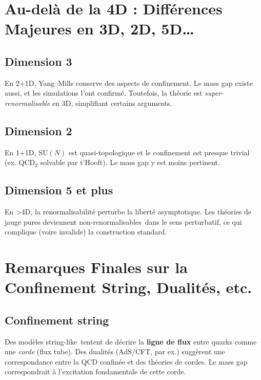 \vspace{1em}

\section{Au-delà de la 4D : Différences Majeures en 3D, 2D, 5D…}
\label{sec:11.4}

\subsection*{Dimension 3}
En 2+1D, Yang--Mills conserve des aspects de confinement. Le mass gap existe aussi, et les simulations l’ont confirmé. Toutefois, la théorie est \emph{super-renormalisable} en 3D, simplifiant certains arguments.

\subsection*{Dimension 2}
En 1+1D, \(\mathrm{SU}(N)\) est quasi-topologique et le confinement est presque trivial (ex. QCD\(_2\) solvable par t’Hooft). Le mass gap y est moins pertinent.

\subsection*{Dimension 5 et plus}
En >4D, la renormalisabilité perturbe la liberté asymptotique. Les théories de jauge pures deviennent \og non-renormalisables\fg\ dans le sens perturbatif, ce qui complique (voire invalide) la construction standard.

\vspace{1em}

\section{Remarques Finales sur la Confinement String, Dualités, etc.}
\label{sec:11.5}

\subsection*{Confinement string}
Des modèles \og string-like\fg\ tentent de décrire la \textbf{ligne de flux} entre quarks comme une \emph{corde} (flux tube). Des dualités (AdS/CFT, par ex.) suggèrent une correspondance entre la QCD confinée et des théories de cordes. Le mass gap correspondrait à l’excitation fondamentale de cette corde.

